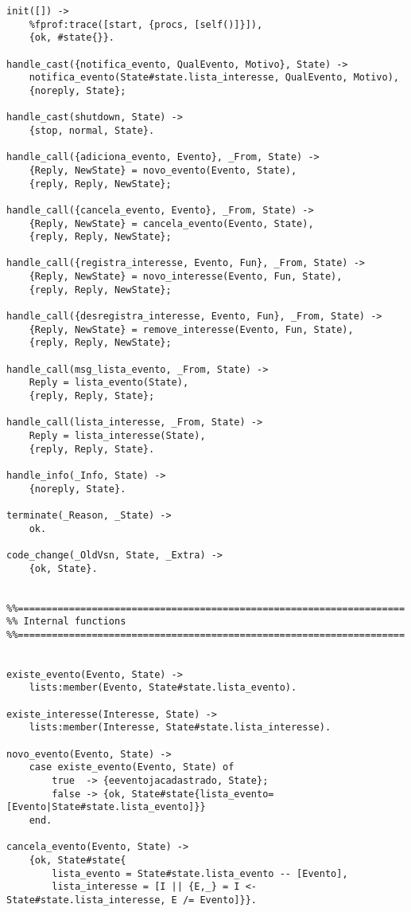 \begin{lstlisting}
init([]) ->
	%fprof:trace([start, {procs, [self()]}]),
    {ok, #state{}}.
    
handle_cast({notifica_evento, QualEvento, Motivo}, State) ->
	notifica_evento(State#state.lista_interesse, QualEvento, Motivo),
	{noreply, State};
    
handle_cast(shutdown, State) ->
    {stop, normal, State}.
    
handle_call({adiciona_evento, Evento}, _From, State) ->
	{Reply, NewState} = novo_evento(Evento, State),
	{reply, Reply, NewState};

handle_call({cancela_evento, Evento}, _From, State) ->
	{Reply, NewState} = cancela_evento(Evento, State),
	{reply, Reply, NewState};

handle_call({registra_interesse, Evento, Fun}, _From, State) ->
	{Reply, NewState} = novo_interesse(Evento, Fun, State),
	{reply, Reply, NewState};

handle_call({desregistra_interesse, Evento, Fun}, _From, State) ->
	{Reply, NewState} = remove_interesse(Evento, Fun, State),
	{reply, Reply, NewState};
    
handle_call(msg_lista_evento, _From, State) ->
	Reply = lista_evento(State),
	{reply, Reply, State};

handle_call(lista_interesse, _From, State) ->
	Reply = lista_interesse(State),
	{reply, Reply, State}.

handle_info(_Info, State) ->
    {noreply, State}.
 
terminate(_Reason, _State) ->
    ok.
 
code_change(_OldVsn, State, _Extra) ->
    {ok, State}.
    
    
%%====================================================================
%% Internal functions
%%====================================================================
    

existe_evento(Evento, State) ->
	lists:member(Evento, State#state.lista_evento).

existe_interesse(Interesse, State) ->
	lists:member(Interesse, State#state.lista_interesse).
    
novo_evento(Evento, State) ->
	case existe_evento(Evento, State) of
		true  -> {eeventojacadastrado, State};
		false -> {ok, State#state{lista_evento=[Evento|State#state.lista_evento]}}
	end.

cancela_evento(Evento, State) ->
	{ok, State#state{
		lista_evento = State#state.lista_evento -- [Evento], 
		lista_interesse = [I || {E,_} = I <- State#state.lista_interesse, E /= Evento]}}.


\end{lstlisting}
